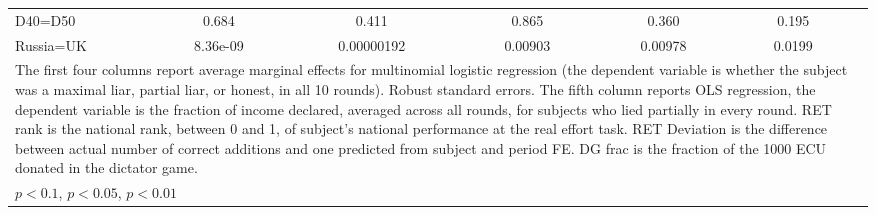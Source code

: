 \begin{tabular}{l|cccccccc|cc}
D40=D50         &    0.684         &         &    0.411         &         &    0.865         &         &    0.360         &         &    0.195         &         \\
Russia=UK       & 8.36e-09         &         &0.00000192         &         &  0.00903         &         &  0.00978         &         &   0.0199         &         \\
\hline\hline
\multicolumn{11}{p{16.5cm}}{\tiny The first four columns report average marginal effects for multinomial logistic regression (the dependent variable is whether the subject was a maximal liar, partial liar, or honest, in all 10 rounds). Robust standard errors. The fifth column reports OLS regression, the dependent variable is the fraction of income declared, averaged across all rounds, for subjects who lied partially in every round. RET rank is the national rank, between 0 and 1, of subject's national performance at the real effort task. RET Deviation is the difference between actual number of correct additions and one predicted from subject and period FE. DG frac is the fraction of the 1000 ECU donated in the dictator game.}\\
\multicolumn{11}{l}{\tiny \sym{*} \(p<0.1\), \sym{**} \(p<0.05\), \sym{***} \(p<0.01\)}\\
\end{tabular}